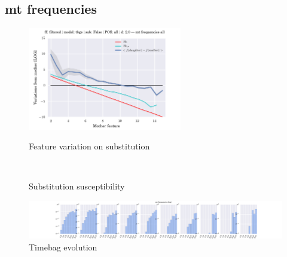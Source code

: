\subsection{mt frequencies}
\begin{figure}[h!]
    \centering
    \includegraphics[width=0.6\textwidth]{images/feature-cards/mt_frequencies/feature_variations.png}
    \caption{Feature variation on substitution}
	~
	\caption{Substitution susceptibility}
    \includegraphics[width=\textwidth]{images/feature-cards/mt_frequencies/timebags_evolution-hist.png}
	\caption{Timebag evolution}
\end{figure}


\clearpage
